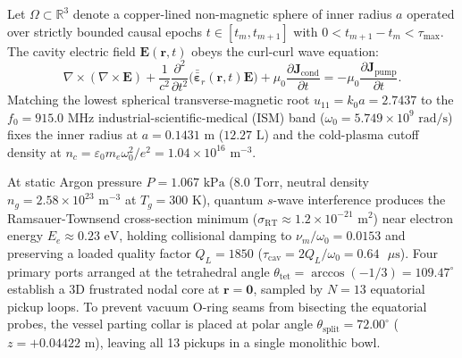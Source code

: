 \documentclass[aps,pra,twocolumn,superscriptaddress,nofootinbib,10pt]{revtex4-2}
\begin{document}
Let $\Omega \subset \mathbb{R}^3$ denote a copper-lined non-magnetic sphere of
inner radius $a$ operated over strictly bounded causal epochs
$t \in [t_m, t_{m+1}]$ with $0 < t_{m+1} - t_m < \tau_{\max}$. The cavity
electric field $\bm{E}(\bm{r}, t)$ obeys the curl-curl wave equation:
\begin{equation}
\nabla \times (\nabla \times \bm{E})
+ \frac{1}{c^2}\frac{\partial^2}{\partial t^2}
  \Big(\bar{\bar{\bm{\varepsilon}}}_r(\bm{r}, t)\bm{E}\Big)
+ \mu_0 \frac{\partial \bm{J}_{\text{cond}}}{\partial t}
= -\mu_0 \frac{\partial \bm{J}_{\text{pump}}}{\partial t}.
\label{eq:wave}
\end{equation}
Matching the lowest spherical transverse-magnetic root $u_{11} = k_0 a = 2.7437$
to the $f_0 = 915.0\text{ MHz}$ industrial-scientific-medical (ISM) band
($\omega_0 = 5.749 \times 10^9\text{ rad/s}$) fixes the inner radius at
$a = 0.1431\text{ m}$ ($12.27\text{ L}$) and the cold-plasma cutoff density at
$n_c = \varepsilon_0 m_e \omega_0^2 / e^2 = 1.04 \times 10^{16}\text{ m}^{-3}$.

At static Argon pressure $P = 1.067\text{ kPa}$ ($8.0\text{ Torr}$, neutral
density $n_g = 2.58 \times 10^{23}\text{ m}^{-3}$ at $T_g = 300\text{ K}$),
quantum $s$-wave interference produces the Ramsauer-Townsend cross-section
minimum ($\sigma_{\text{RT}} \approx 1.2 \times 10^{-21}\text{ m}^2$) near
electron energy $E_e \approx 0.23\text{ eV}$, holding collisional damping to
$\nu_m / \omega_0 = 0.0153$ and preserving a loaded quality factor
$Q_L = 1850$ ($\tau_{\text{cav}} = 2Q_L/\omega_0 = 0.64\text{ }\mu\text{s}$).
Four primary ports arranged at the tetrahedral angle
$\theta_{\text{tet}} = \arccos(-1/3) = 109.47^\circ$ establish a 3D frustrated
nodal core at $\bm{r} = \bm{0}$, sampled by $N = 13$ equatorial pickup loops.
To prevent vacuum O-ring seams from bisecting the equatorial probes, the vessel
parting collar is placed at polar angle $\theta_{\text{split}} = 72.00^\circ$
($z = +0.04422\text{ m}$), leaving all 13 pickups in a single monolithic bowl.
\end{document}
